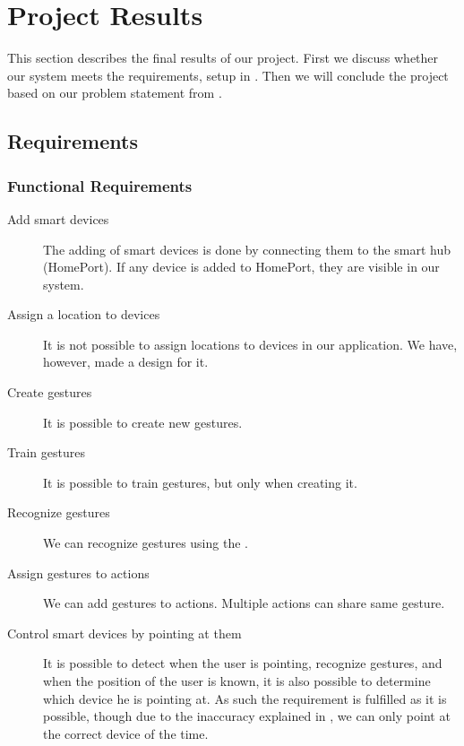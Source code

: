 \section{Project Results}\label{sec:results}
This section describes the final results of our project. 
First we discuss whether our system meets the requirements, 
setup in . 
Then we will conclude the project based on our problem statement from .

\subsection{Requirements}\label{sec:conclusion-requirements}
\subsubsection{Functional Requirements}
\begin{description}
  \item[\yes Add smart devices] The adding of smart devices is done by connecting them to the smart hub (HomePort). If any device is added to HomePort, they are visible in our system. 
  \item[\no Assign a location to devices] It is not possible to assign locations to devices in our application. We have, however, made a design for it. 
  \item[\yes Create gestures] It is possible to create new gestures.
  \item[\yes Train gestures] It is possible to train gestures, but only when creating it. 
  \item[\yes Recognize gestures] We can recognize gestures using the \threedollar.
  \item[\yes Assign gestures to actions] We can add gestures to actions. Multiple actions can share same gesture.  
  \item[\yes Control smart devices by pointing at them] It is possible to detect when the user is pointing, recognize gestures, and when the position of the user is known, it is also possible to determine which device he is pointing at. As such the requirement is fulfilled as it is possible, though due to the inaccuracy explained in , we can only point at the correct device  of the time. 
\end{description}

